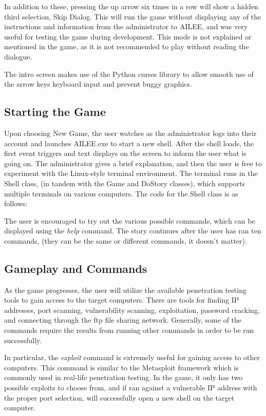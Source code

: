 \documentclass[conference]{IEEEtran}
\begin{document}
In addition to these, pressing the up arrow six times in a row will show a hidden third selection, Skip Dialog. This will run the game without displaying any of the instructions and information from the administrator to AILEE, and was very useful for testing the game during development. This mode is not explained or mentioned in the game, as it is not recommended to play without reading the dialogue.

The intro screen makes use of the Python curses library to allow smooth use of the arrow keys keyboard input and prevent buggy graphics.

\subsection{Starting the Game}
Upon choosing New Game, the user watches as the administrator logs into their account and launches AILEE.exe to start a new shell. After the shell loads, the first event triggers and text displays on the screen to inform the user what is going on. The administrator gives a brief explanation, and then the user is free to experiment with the Linux-style terminal environment. The terminal runs in the Shell class, (in tandem with the Game and DoStory classes), which supports multiple terminals on various computers. The code for the Shell class is as follows:



The user is encouraged to try out the various possible commands, which can be displayed using the \textit{help} command. The story continues after the user has ran ten commands, (they can be the same or different commands, it doesn't matter).

\subsection{Gameplay and Commands}
As the game progresses, the user will utilize the available penetration testing tools to gain access to the target computers. There are tools for finding IP addresses, port scanning, vulnerability scanning, exploitation, password cracking, and connecting through the ftp file sharing network. Generally, some of the commands require the results from running other commands in order to be run successfully. 

In particular, the \textit{exploit} command is extremely useful for gaining access to other computers. This command is similar to the Metasploit framework which is commonly used in real-life penetration testing. In the game, it only has two possible exploits to choose from, and if ran against a vulnerable IP address with the proper port selection, will successfully open a new shell on the target computer. 
\end{document}
